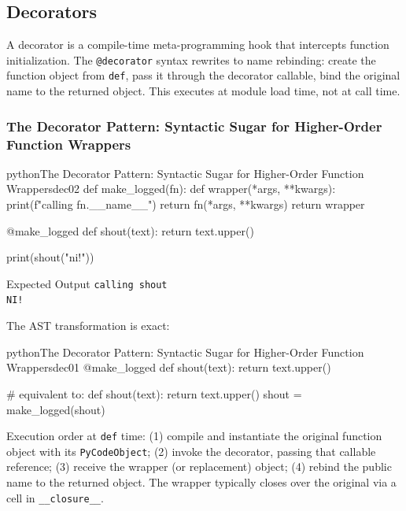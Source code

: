 \subsection{Decorators}

A decorator is a compile-time meta-programming hook that intercepts function initialization. The \texttt{@decorator} syntax rewrites to name rebinding: create the function object from \texttt{def}, pass it through the decorator callable, bind the original name to the returned object. This executes at module load time, not at call time.

\subsubsection{The Decorator Pattern: Syntactic Sugar for Higher-Order Function Wrappers}

\begin{codebox}[]{python}{The Decorator Pattern: Syntactic Sugar for Higher-Order Function Wrappers}{dec02}
def make_logged(fn):
    def wrapper(*args, **kwargs):
        print(f"calling {fn.__name__}")
        return fn(*args, **kwargs)
    return wrapper

@make_logged
def shout(text):
    return text.upper()

print(shout("ni!"))
\end{codebox}


\begin{iobox}{Expected Output}
\texttt{calling shout} \\
\texttt{NI!} \\
\end{iobox}




The AST transformation is exact:

\begin{codebox}[]{python}{The Decorator Pattern: Syntactic Sugar for Higher-Order Function Wrappers}{dec01}
@make_logged
def shout(text):
    return text.upper()

# equivalent to:
def shout(text):
    return text.upper()
shout = make_logged(shout)
\end{codebox}


Execution order at \texttt{def} time: (1) compile and instantiate the original function object with its \texttt{PyCodeObject}; (2) invoke the decorator, passing that callable reference; (3) receive the wrapper (or replacement) object; (4) rebind the public name to the returned object. The wrapper typically closes over the original via a cell in \texttt{\_\_closure\_\_}.

